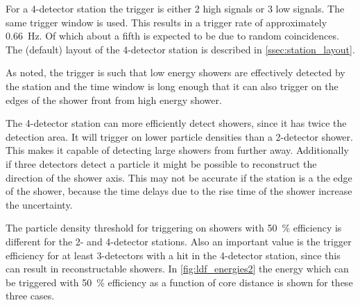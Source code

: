 For a 4-detector station the trigger is either 2 high signals or 3 low signals. The same trigger window is used. This results in a trigger rate of approximately \SI{0.66}{\hertz}. Of which about a fifth is expected to be due to random coincidences. The (default) layout of the 4-detector station is described in \cref{ssec:station_layout}.

As noted, the trigger is such that low energy showers are effectively detected by the station and the time window is long enough that it can also trigger on the edges of the shower front from high energy shower.

The 4-detector station can more efficiently detect showers, since it has twice the detection area. It will trigger on lower particle densities than a 2-detector shower. This makes it capable of detecting large showers from further away. Additionally if three detectors detect a particle it might be possible to reconstruct the direction of the shower axis. This may not be accurate if the station is a the edge of the shower, because the time delays due to the rise time of the shower increase the uncertainty.

The particle density threshold for triggering on showers with \SI{50}{\percent} efficiency is different for the 2- and 4-detector stations. Also an important value is the trigger efficiency for at least 3-detectors with a hit in the 4-detector station, since this can result in reconstructable showers. In \cref{fig:ldf_energies2} the energy which can be triggered with \SI{50}{\percent} efficiency as a function of core distance is shown for these three cases.

